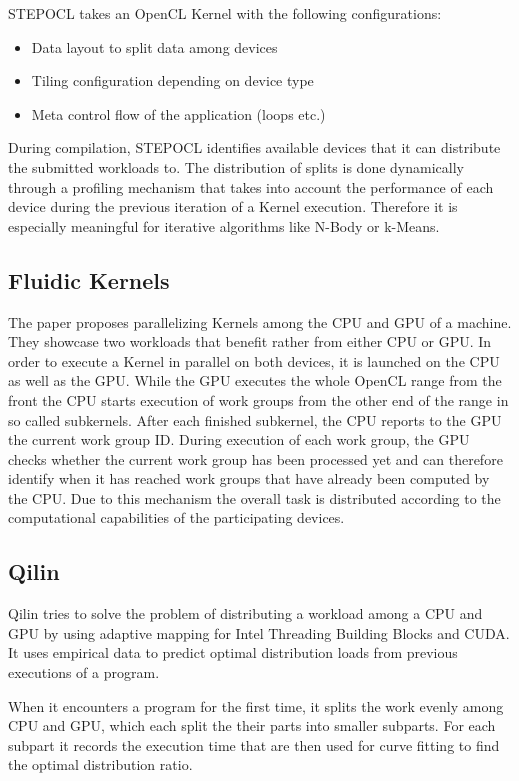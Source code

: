 STEPOCL takes an OpenCL Kernel with the following configurations:
\begin{itemize}
    \item Data layout to split data among devices
    \item Tiling configuration depending on device type
    \item Meta control flow of the application (loops etc.)
\end{itemize}

During compilation, STEPOCL identifies available devices that it can distribute the submitted workloads to. The distribution of splits is done dynamically through a profiling mechanism that takes into account the performance of each device during the previous iteration of a Kernel execution. Therefore it is especially meaningful for iterative algorithms like N-Body or k-Means.

\subsection*{Fluidic Kernels\cite{fluidic}}

The paper proposes parallelizing Kernels among the CPU and GPU of a machine. They showcase two workloads that benefit rather from either CPU or GPU. In order to execute a Kernel in parallel on both devices, it is launched on the CPU as well as the GPU. While the GPU executes the whole OpenCL range from the front the CPU starts execution of work groups from the other end of the range in so called subkernels. After each finished subkernel, the CPU reports to the GPU the current work group ID. During execution of each work group, the GPU checks whether the current work group has been processed yet and can therefore identify when it has reached work groups that have already been computed by the CPU. Due to this mechanism the overall task is distributed according to the computational capabilities of the participating devices.

\subsection*{Qilin\cite{qilin}}

Qilin tries to solve the problem of distributing a workload among a CPU and GPU by using adaptive mapping for Intel Threading Building Blocks and CUDA. It uses empirical data to predict optimal distribution loads from previous executions of a program.

When it encounters a program for the first time, it splits the work evenly among CPU and GPU, which each split the their parts into smaller subparts. For each subpart it records the execution time that are then used for curve fitting to find the optimal distribution ratio.

